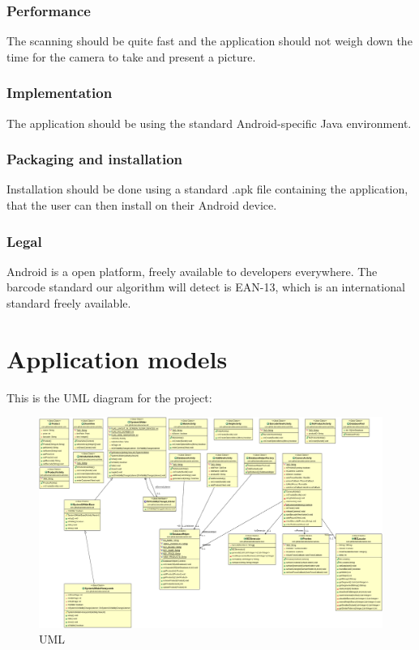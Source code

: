 \documentclass{report}
\begin{document}
\subsection{Performance}
The scanning should be quite fast and the application should not weigh down the time for the camera to take and present a picture.

\subsection{Implementation}
The application should be using the standard Android-specific Java environment.

\subsection{Packaging and installation}
Installation should be done using a standard .apk file containing the application, that the user can then install on their Android device.

\subsection{Legal}
Android is a open platform, freely available to developers everywhere. The barcode standard our algorithm will detect is EAN-13, which is an international standard freely available.

\pagebreak

\chapter{Application models}
This is the UML diagram for the project:
\begin{figure}[H]
		\centering
		\includegraphics[width=\textwidth]{uml.png}
		\caption{UML}
		\label{fig:UML}
\end{figure}
\end{document}
